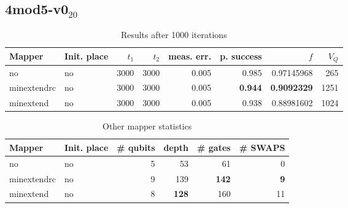 \documentclass[11pt]{article}
\begin{document}
\subsection{4mod5-v0\(_{\text{20}}\)}
\label{sec:org4d10d6d}
\begin{table}[!htpb]
\caption{\label{tab:orgefb5fa8}
Results after 1000 iterations}
\centering
\begin{tabular}{llrrrrrr}
\hline
Mapper & Init. place & \(t_1\) & \(t_2\) & meas. err. & p. success & \(f\) & \(V_Q\)\\
\hline
no & no & 3000 & 3000 & 0.005 & 0.985 & 0.97145968 & 265\\
\hline
minextendrc & no & 3000 & 3000 & 0.005 & \textbf{0.944} & \textbf{0.9092329} & 1251\\
minextend & no & 3000 & 3000 & 0.005 & 0.938 & 0.88981602 & 1024\\
\hline
\end{tabular}
\end{table}

\begin{table}[!htpb]
\caption{\label{tab:orgfc567ba}
Other mapper statistics}
\centering
\small
\begin{tabular}{llrrrr}
\hline
Mapper & Init. place & \# qubits & depth & \# gates & \# SWAPS\\
\hline
no & no & 5 & 53 & 61 & 0\\
\hline
minextendrc & no & 9 & 139 & \textbf{142} & \textbf{9}\\
minextend & no & 8 & \textbf{128} & 160 & 11\\
\hline
\end{tabular}
\end{table}
\end{document}
